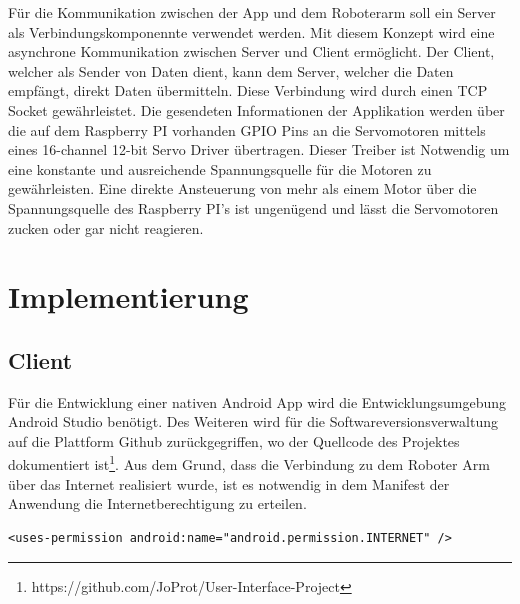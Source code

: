 \documentclass[12pt,					%
							 oneside,			%
							 a4paper,			%
							 halfparskip,		%
							 liststotoc,			%
							 bibtotoc,			%
							 fleqn,				%
							 pointlessnumbers]	%
							 {scrreprt}
\begin{document}

Für die Kommunikation zwischen der App und dem \glqq{}Roboterarm\grqq{} soll ein Server als Verbindungskomponennte verwendet werden. Mit diesem Konzept wird eine asynchrone Kommunikation zwischen Server und Client ermöglicht. Der Client, welcher als Sender von Daten dient, kann dem Server, welcher die Daten empfängt, direkt Daten übermitteln. Diese Verbindung wird durch einen TCP Socket gewährleistet. Die gesendeten Informationen der Applikation werden über die auf dem Raspberry PI vorhanden GPIO Pins an die Servomotoren mittels eines  \glqq{}16-channel 12-bit Servo Driver\grqq{} übertragen. Dieser Treiber ist Notwendig um eine konstante und ausreichende Spannungsquelle für die Motoren zu gewährleisten. Eine direkte Ansteuerung von mehr als einem Motor über die Spannungsquelle des Raspberry PI's ist ungenügend und lässt die Servomotoren zucken oder gar nicht reagieren.


\chapter{Implementierung}	
\section{Client}
Für die Entwicklung einer nativen Android App wird die Entwicklungsumgebung Android Studio benötigt. Des Weiteren wird für die Softwareversionsverwaltung auf die Plattform Github zurückgegriffen, wo der Quellcode des Projektes dokumentiert ist\footnote{https://github.com/JoProt/User-Interface-Project}. Aus dem Grund, dass die Verbindung zu dem Roboter Arm über das Internet realisiert wurde, ist es notwendig in dem Manifest der Anwendung die Internetberechtigung zu erteilen. \\
\begin{lstlisting}
<uses-permission android:name="android.permission.INTERNET" />
\end{lstlisting}
\end{document}
